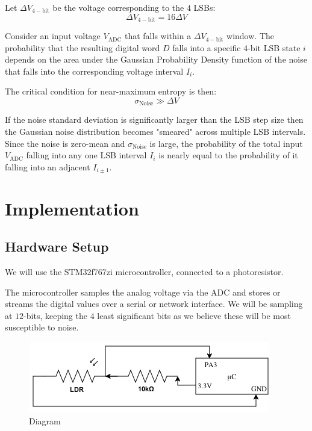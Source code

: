 Let \(\Delta V_{4-\text{bit}}\) be the voltage corresponding to 
the \(4\) LSBs: 
\[ 
    \Delta V_{4-\text{bit}} = 16\Delta V
\]

Consider an input voltage \(V_{\text{ADC}}\) that falls within 
a \(\Delta V_{4-\text{bit}}\) window. The probability that 
the resulting digital word \(D\) falls into a specific \(4\)-bit 
LSB state \(i\) depends on the area under the Gaussian Probability 
Density function of the noise that falls into the corresponding 
voltage interval \(I_i\). 

The critical condition for near-maximum entropy is then: 
\[ 
    \sigma_{\text{Noise}} \gg \Delta V
\]

If the noise standard deviation is significantly larger than 
the LSB step size then the Gaussian noise distribution becomes 
"smeared" across multiple LSB intervals. Since the noise is 
zero-mean and \(\sigma_{\text{Noise}}\) is large, the probability 
of the total input \(V_{\text{ADC}}\) falling into any one 
LSB interval \(I_i\) is nearly equal to the probability of 
it falling into an adjacent \(I_{i \pm 1}\). 




\newpage
\section{Implementation}
\subsection{Hardware Setup}
We will use the STM32f767zi microcontroller, connected to a 
photoresistor.

The microcontroller samples the analog voltage via the ADC and 
stores or 
streams the digital values over a serial or network interface.
We will be sampling at \(12\)-bits, keeping the \(4\) least 
significant bits as we believe these will be most susceptible to 
noise.


\begin{figure}[h]
    \centering
    \includegraphics[width=0.6\linewidth]{./images/WIRING_DIAGRAM_LIGHT.png} 
    \caption{Diagram}
    \label{fig:wire_diagram} 
\end{figure}

